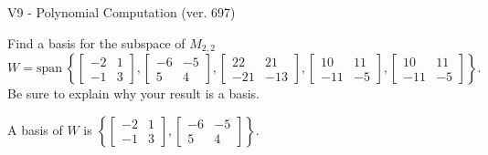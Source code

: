 \begin{exercise}
  \begin{exerciseTitle}V9 - Polynomial Computation (ver. 697)\end{exerciseTitle}
  \begin{exerciseStatement}
    Find a basis for the subspace of \(M_{2,2}\) 
\[W=\mathrm{span}\ \left\{\left[\begin{array}{cc}
-2 & 1 \\
-1 & 3
\end{array}\right] , \left[\begin{array}{cc}
-6 & -5 \\
5 & 4
\end{array}\right] , \left[\begin{array}{cc}
22 & 21 \\
-21 & -13
\end{array}\right] , \left[\begin{array}{cc}
10 & 11 \\
-11 & -5
\end{array}\right] , \left[\begin{array}{cc}
10 & 11 \\
-11 & -5
\end{array}\right]\right\}.\]
 Be sure to explain why your result is a basis.


  \end{exerciseStatement}
  \begin{exerciseAnswer}
   A basis of \(W\) is  \(\left\{\left[\begin{array}{cc}
-2 & 1 \\
-1 & 3
\end{array}\right] , \left[\begin{array}{cc}
-6 & -5 \\
5 & 4
\end{array}\right]\right\}\).
  


  \end{exerciseAnswer}
\end{exercise}
